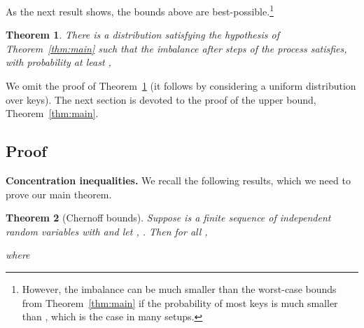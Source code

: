 \documentclass[10pt,conference,letterpaper]{IEEEtran}
\newcommand{\spara}[1]{\smallskip\noindent\textbf{#1}}
\newcommand{\mycomment}[1]{}
\newtheorem{theorem}{Theorem}[section]
\begin{document}
As the next result shows, the bounds above are best-possible.\footnote{\scriptsize However, the imbalance can be much smaller than the worst-case bounds from Theorem~\ref{thm:main} if the probability of most keys is much smaller than , which is the case in many setups. }
\begin{theorem}\label{thm:lb}
There is a distribution  satisfying the hypothesis of Theorem~\ref{thm:main} such that
the imbalance after  steps of the  process satisfies, with probability at least ,

\end{theorem}

We omit the proof of Theorem~\ref{thm:lb} (it follows by considering a uniform distribution over  keys).
The next section is devoted to the proof of the upper bound, Theorem~\ref{thm:main}. 



\subsection{Proof}
\mycomment{
First define .



\begin{theorem}
Conditioned on , with high probability after  throws the normalized imbalance after running the \code{Greedy-} process satisfies

Also, the optimal normalized imbalance after the hash functions are chosen satisfies

\end{theorem}

\begin{theorem}
With high probability,
     
and
for ,
        
\end{theorem}

In particular, when , the maximum load will be  whether we use one choice or  choices.
On the other hand,
From these results we see that when , the imbalance with  or
In the typical case we consider where ,

}



\spara{Concentration inequalities.}
We recall the following results, which we need to prove our main theorem.
\begin{theorem}[Chernoff bounds]\label{chernoff}
Suppose  is a finite sequence of independent random variables with  and let , .
Then for all ,

where
\end{theorem}
\end{document}
